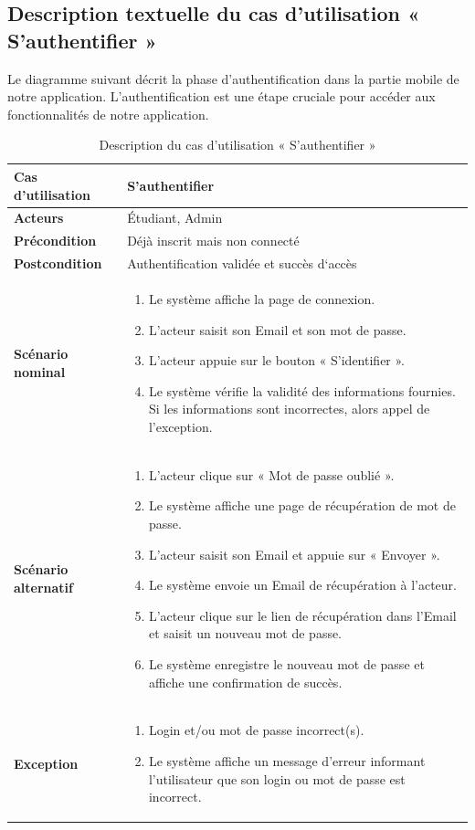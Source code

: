 \begin{sloppypar}
\subsection{Description textuelle du cas d’utilisation « S’authentifier »}
\vspace{-4mm}
Le diagramme suivant décrit la phase d’authentification dans la partie mobile de notre application. L'authentification est une étape cruciale pour accéder aux fonctionnalités de notre application.
\vspace{5mm}
\begin{table}[h]
\centering
\begin{tabular}{|p{3cm}|p{12cm}|}
\hline
\textbf{Cas d'utilisation} & S’authentifier  \\
\hline
\textbf{Acteurs} & Étudiant, Admin \\
\hline
\textbf{Précondition} & Déjà inscrit mais non connecté \\
\hline
\textbf{Postcondition} & Authentification validée et succès d‘accès \\
\hline
\textbf{Scénario nominal} & 
\begin{enumerate}
    \item Le système affiche la page de connexion.
    \item L’acteur saisit son Email et son mot de passe.
    \item L’acteur appuie sur le bouton « S’identifier ».
    \item Le système vérifie la validité des informations fournies. Si les informations sont incorrectes, alors appel de l’exception.
\end{enumerate} \\
\hline
\textbf{Scénario alternatif} & 
\begin{enumerate}
    \item L’acteur clique sur « Mot de passe oublié ».
    \item Le système affiche une page de récupération de mot de passe.
    \item L’acteur saisit son Email et appuie sur « Envoyer ».
    \item Le système envoie un Email de récupération à l’acteur.
    \item L’acteur clique sur le lien de récupération dans l'Email et saisit un nouveau mot de passe.
    \item Le système enregistre le nouveau mot de passe et affiche une confirmation de succès.
\end{enumerate} \\
\hline
\textbf{Exception} & 
\begin{enumerate}
    \item Login et/ou mot de passe incorrect(s).
    \item Le système affiche un message d’erreur informant l’utilisateur que son login ou mot de passe est incorrect.
\end{enumerate} \\
\hline
\end{tabular}
\caption{Description du cas d’utilisation « S'authentifier »}
\end{table}


\end{sloppypar}
